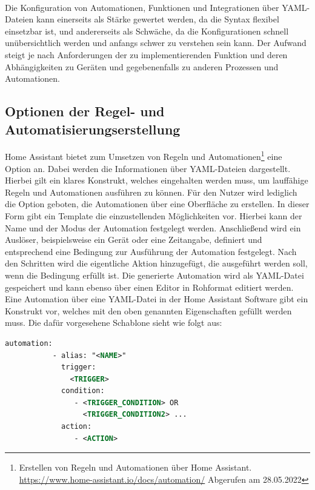     \\
    Die Konfiguration von Automationen, Funktionen und Integrationen über YAML-Dateien kann einerseits als Stärke gewertet werden, 
    da die Syntax flexibel einsetzbar ist, und 
    andererseits als Schwäche, da die 
    Konfigurationen schnell unübersichtlich werden und anfangs schwer zu verstehen sein kann. Der Aufwand steigt je nach 
    Anforderungen der zu implementierenden Funktion und deren Abhängigkeiten zu Geräten und gegebenenfalls zu anderen 
    Prozessen und Automationen. 

    \subsection{Optionen der Regel- und Automatisierungserstellung}
        Home Assistant bietet zum Umsetzen von Regeln und Automationen\footnote{Erstellen von Regeln und Automationen über Home Assistant. \url{https://www.home-assistant.io/docs/automation/} Abgerufen am 28.05.2022} 
        eine Option an. Dabei werden die Informationen über 
        YAML-Dateien dargestellt. Hierbei gilt ein klares Konstrukt, welches eingehalten werden muss, um lauffähige Regeln 
        und Automationen ausführen zu können. Für den Nutzer wird lediglich die Option geboten, die Automationen über eine 
        Oberfläche zu erstellen. In dieser Form gibt ein Template die einzustellenden Möglichkeiten vor. Hierbei kann 
        der Name und der Modus der Automation festgelegt werden. Anschließend wird ein Auslöser, beispielsweise ein Gerät 
        oder eine Zeitangabe, definiert und entsprechend eine Bedingung zur Ausführung der Automation festgelegt. Nach den 
        Schritten wird die eigentliche Aktion hinzugefügt, die ausgeführt werden soll, wenn die Bedingung erfüllt ist. Die 
        generierte Automation wird als YAML-Datei gespeichert und kann ebenso über einen Editor in Rohformat editiert werden. 
        Eine Automation über eine YAML-Datei in der Home Assistant Software gibt ein Konstrukt vor, welches mit den oben 
        genannten Eigenschaften gefüllt werden muss. Die dafür vorgesehene Schablone sieht wie folgt aus: 
        \\
        \linebreak
        \begin{lstlisting}[language=xml, frame=lines, xleftmargin=\parindent, style=algoBericht, label={code:YAML}, captionpos=b, caption={Konstrukt zur Regeldefinition über Home Assistant}]
        automation:
           - alias: "<NAME>"
             trigger:
               <TRIGGER>
             condition:
                - <TRIGGER_CONDITION> OR
                  <TRIGGER_CONDITION2> ...
             action:
                - <ACTION>
        \end{lstlisting}
